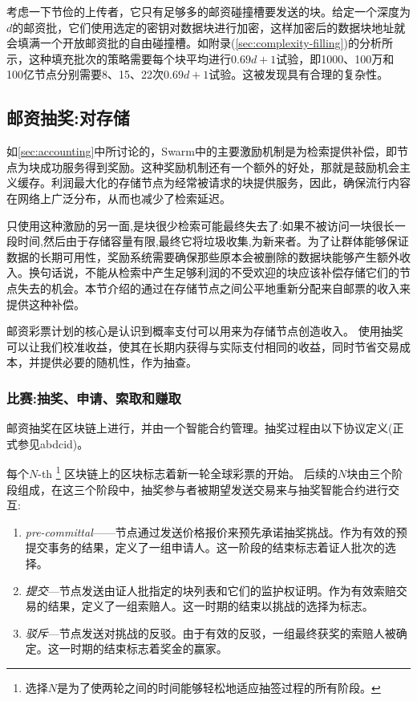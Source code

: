 考虑一下节俭的上传者，它只有足够多的邮资碰撞槽要发送的块。给定一个深度为$d$的邮资批，它们使用选定的密钥对数据块进行加密，这样加密后的数据块地址就会填满一个开放邮资批的自由碰撞槽。如附录(\ref{sec:complexity-filling})的分析所示，这种填充批次的策略需要每个块平均进行$0.69d+1$试验，即1000、100万和100亿节点分别需要8、15、22次$0.69d+1$试验。这被发现具有合理的复杂性。


\subsection{邮资抽奖:对存储}\label{sec:postage-lottery}

\yellow{}

如\ref{sec:accounting}中所讨论的，Swarm中的主要激励机制是为检索提供补偿，即节点为块成功服务得到奖励。这种奖励机制还有一个额外的好处，那就是鼓励机会主义缓存。利润最大化的存储节点为经常被请求的块提供服务，因此，确保流行内容在网络上广泛分布，从而也减少了检索延迟。

只使用这种激励的另一面,是块很少检索可能最终失去了:如果不被访问一块很长一段时间,然后由于存储容量有限,最终它将垃圾收集,为新来者。为了让群体能够保证数据的长期可用性，奖励系统需要确保那些原本会被删除的数据块能够产生额外收入。换句话说，不能从检索中产生足够利润的不受欢迎的块应该补偿存储它们的节点失去的机会。本节介绍的通过在存储节点之间公平地重新分配来自邮票的收入来提供这种补偿。



邮资彩票计划的核心是认识到概率支付可以用来为存储节点创造收入。
使用抽奖可以让我们校准收益，使其在长期内获得与实际支付相同的收益，同时节省交易成本，并提供必要的随机性，作为抽查。


\subsubsection{比赛:抽奖、申请、索取和赚取}

邮资抽奖在区块链上进行，并由一个智能合约管理。抽奖过程由以下协议定义(正式参见abdcid)。 

每个$N$-th %
%
\footnote{选择$N$是为了使两轮之间的时间能够轻松地适应抽签过程的所有阶段。}
%
区块链上的区块标志着新一轮全球彩票的开始。
后续的$N$块由三个阶段组成，在这三个阶段中，抽奖参与者被期望发送交易来与抽奖智能合约进行交互: 

\begin{enumerate}
\item \emph{pre-committal}——节点通过发送价格报价来预先承诺抽奖挑战。作为有效的预提交事务的结果，定义了一组申请人。这一阶段的结束标志着证人批次的选择。
\item \emph{提交}—节点发送由证人批指定的块列表和它们的监护权证明。作为有效索赔交易的结果，定义了一组索赔人。这一时期的结束以挑战的选择为标志。
\item \emph{驳斥}—节点发送对挑战的反驳。由于有效的反驳，一组最终获奖的索赔人被确定。这一时期的结束标志着奖金的赢家。
\end{enumerate}

